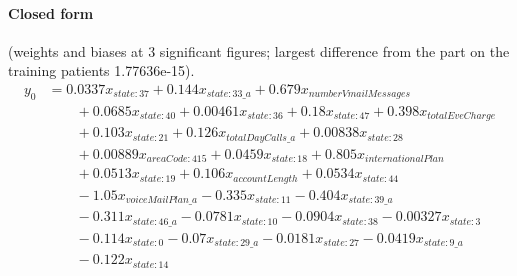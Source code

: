 \documentclass[a4paper,10pt]{article}
\newif\ifreviewmarks
\newcommand{\reviewrule}{\noindent{\color{BrickRed}\rule{\linewidth}{0.8pt}}}
\newenvironment{drafted}[1][]{%
  \ifreviewmarks\par\addvspace{\medskipamount}\reviewrule\par\nopagebreak
  \noindent{\color{BrickRed}\sffamily\footnotesize\textbf{Thesis Draft}\quad #1\hfill review}\par\nopagebreak\smallskip\fi}{%
  \ifreviewmarks\par\smallskip\noindent{\color{BrickRed}\sffamily\footnotesize end of thesis draft}\par\nopagebreak\reviewrule\par\medskip\fi}
\begin{document}
\begin{drafted}[plain-language layer: churn100-s4-c3]
\paragraph{Closed form} {\footnotesize(weights and biases at 3 significant figures; largest difference from the part on the training patients 1.77636e-15).}
{\small\begingroup\allowdisplaybreaks
\begin{align*}
y_{0} &= 0.0337 x_{state:37} + 0.144 x_{state:33\_a} + 0.679 x_{numberVmailMessages} \\
&\qquad + 0.0685 x_{state:40} + 0.00461 x_{state:36} + 0.18 x_{state:47} + 0.398 x_{totalEveCharge} \\
&\qquad + 0.103 x_{state:21} + 0.126 x_{totalDayCalls\_a} + 0.00838 x_{state:28} \\
&\qquad + 0.00889 x_{areaCode:415} + 0.0459 x_{state:18} + 0.805 x_{internationalPlan} \\
&\qquad + 0.0513 x_{state:19} + 0.106 x_{accountLength} + 0.0534 x_{state:44} \\
&\qquad - 1.05 x_{voiceMailPlan\_a} - 0.335 x_{state:11} - 0.404 x_{state:39\_a} \\
&\qquad - 0.311 x_{state:46\_a} - 0.0781 x_{state:10} - 0.0904 x_{state:38} - 0.00327 x_{state:3} \\
&\qquad - 0.114 x_{state:0} - 0.07 x_{state:29\_a} - 0.0181 x_{state:27} - 0.0419 x_{state:9\_a} \\
&\qquad - 0.122 x_{state:14}
\end{align*}\endgroup}


\end{drafted}
\end{document}
